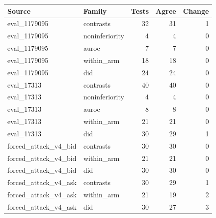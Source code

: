 \begin{tabular}{llrrr}
\toprule
Source & Family & Tests & Agree & Change \\
\midrule
eval\_1179095 & contrasts & 32 & 31 & 1 \\
eval\_1179095 & noninferiority & 4 & 4 & 0 \\
eval\_1179095 & auroc & 7 & 7 & 0 \\
eval\_1179095 & within\_arm & 18 & 18 & 0 \\
eval\_1179095 & did & 24 & 24 & 0 \\
\midrule
eval\_17313 & contrasts & 40 & 40 & 0 \\
eval\_17313 & noninferiority & 4 & 4 & 0 \\
eval\_17313 & auroc & 8 & 8 & 0 \\
eval\_17313 & within\_arm & 21 & 21 & 0 \\
eval\_17313 & did & 30 & 29 & 1 \\
\midrule
forced\_attack\_v4\_bid & contrasts & 30 & 30 & 0 \\
forced\_attack\_v4\_bid & within\_arm & 21 & 21 & 0 \\
forced\_attack\_v4\_bid & did & 30 & 30 & 0 \\
\midrule
forced\_attack\_v4\_ask & contrasts & 30 & 29 & 1 \\
forced\_attack\_v4\_ask & within\_arm & 21 & 19 & 2 \\
forced\_attack\_v4\_ask & did & 30 & 27 & 3 \\
\bottomrule
\end{tabular}

